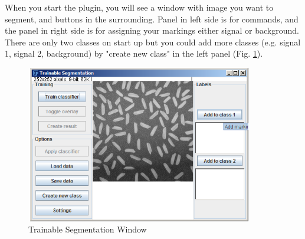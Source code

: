 When you start the plugin, you
will see a window with image you want to segment, and buttons in the
surrounding. Panel in left side is for commands, and the panel in right
side is for assigning your markings either signal or background. There
are only two classes on start up but you could add more classes (e.g.
signal 1, signal 2, background) by "create new
class" in the left panel (Fig. \ref{fig:img121}). 
\begin{figure}[H]
\begin{center}
\includegraphics[width=9.947cm,height=6.872cm]{fig/CMCIBasicCourse201102-img121.png}
\caption{ Trainable Segmentation Window}
\label{fig:img121}
\end{center}
\end{figure}

